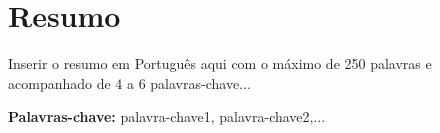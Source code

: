 \section*{Resumo}


Inserir o resumo em Portugu\^{e}s aqui com o máximo de 250 palavras e acompanhado de 4 a 6 palavras-chave...

\vfill

\textbf{\Large Palavras-chave:} palavra-chave1, palavra-chave2,...

